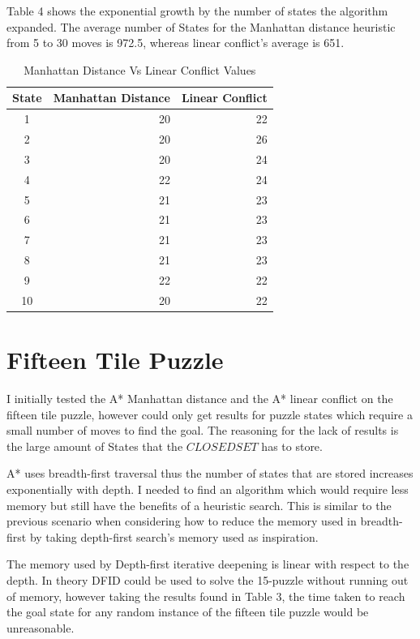 \documentclass[final]{cmpreport}
\begin{document}
  Table 4 shows the exponential growth by the number of states the algorithm expanded. The average number of States for the Manhattan distance heuristic from 5 to 30 moves is 972.5, whereas linear conflict's average is 651.


\begin{table}[ht]
	\caption{Manhattan Distance Vs Linear Conflict Values}
	\begin{center}
		\begin{tabular}{crr} \hline
			State & Manhattan Distance  & Linear Conflict    \\ \hline
			1  & 20 & 22  \\
			2 & 20  & 26 \\ 
			3 & 20 & 24  \\ 
			4 & 22 & 24  \\
		    5 & 21  & 23 \\ 
			6 & 21 & 23  \\ 
			7 & 21 & 23  \\ 
			8 & 21 & 23  \\ 
			9 & 22 & 22  \\ 
			10 & 20 & 22  \\ \hline
		\end{tabular}
	\end{center}
\end{table}


\section{Fifteen Tile Puzzle}
I initially tested the A* Manhattan distance and the A* linear conflict on the fifteen tile puzzle, however could only get results for puzzle states which require a small number of moves to find the goal. The reasoning for the lack of results is the large amount of States that the $CLOSEDSET$ has to store. 

A* uses breadth-first traversal thus the number of states that are stored increases exponentially with depth. I needed to find an algorithm which would require less memory but still have the benefits of a heuristic search. This is similar to the previous scenario when considering how to reduce the memory used in breadth-first by taking depth-first search's memory used as inspiration.

The memory used by Depth-first iterative deepening is linear with respect to the depth. In theory DFID could be used to solve the 15-puzzle without running out of memory, however taking the results found in Table 3, the time taken to reach the goal state for any random instance of the fifteen tile puzzle would be unreasonable.
\end{document}
